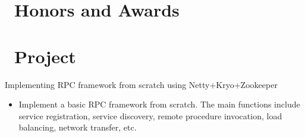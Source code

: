 \documentclass{resume}
\begin{document}
\section{\faHeartO\ Honors and Awards}

\section{\faInfo\ Project}

 Implementing RPC framework from scratch using Netty+Kryo+Zookeeper
\begin{itemize}[parsep=0.5ex]
  \item Implement a basic RPC framework from scratch. The main functions include service registration, service discovery, remote procedure invocation, load balancing, network transfer, etc.
\end{itemize}

%
%
\end{document}
